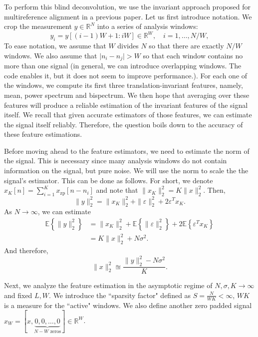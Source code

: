 \documentclass[12pt,a4paper]{article}
\theoremstyle{plain}
\theoremstyle{definition}
\theoremstyle{remark}
\theoremstyle{plain}
\theoremstyle{remark}
\theoremstyle{plain}
\theoremstyle{plain}
\newcommand{\RN}{\mathbb{R}^N}
\newcommand{\E}[1]{\mathbb{E}\left\{{#1} \right\}}
\newcommand{\xz}{x_{\textrm{zp}}}
\begin{document}
To perform this blind deconvolution, we use the invariant approach proposed for multireference alignment in a previous paper. Let us  first introduce  notation. We crop the measurement $y\in\RN$ into a series of analysis windows: 
\begin{equation}
    y_i = y[(i-1)W + 1 : iW ]\in\mathbb{R}^W, \quad i=1,\ldots,N/W, 
\end{equation}
To ease notation, we assume that  $W$ divides $N$  so that there are exactly $N/W$ windows. We also assume that $\vert n_i - n_j\vert >W$ so that each window contains no more than one signal (in general, we can introduce overlapping windows. The code enables it, but it does not seem to improve performance.).
For each one of the windows, we compute its first three translation-invariant features, namely, mean, power spectrum and bispectrum. We then hope that averaging over these features will produce a reliable estimation of the invariant features of the signal itself. 
We recall that given accurate estimators of those features, we can estimate the signal itself reliably. Therefore, the question boils down to the accuracy of these feature estimations.

Before moving ahead to the feature estimators, we need to estimate the norm of the signal. This is necessary since many analysis windows do not contain information on the signal, but pure noise. We will use the norm to scale the the signal's estimator.
This can be done as follows. For short, we denote $x_K[n]=\sum_{i=1}^K \xz[n-n_i]$ and note that $\|x_K\|_2^2 = K\|x\|_2^2$. 
Then,
\begin{equation}
\| y\|_2^2 =  \| x_K\|_2^2 + \|\varepsilon\|_2^2 + 2\varepsilon^Tx_K. 
\end{equation}  
As $N\to\infty$, we can estimate 
\begin{equation}
\begin{split}
\E{\| y\|_2^2} &=  \| x_K\|_2^2 + \E{\|\varepsilon\|_2^2} + 2\E{\varepsilon^Tx_K} \\ 
&= K\|x\|_2^2 + N\sigma^2. 
\end{split}	 
\end{equation}   
 And therefore, 
 \begin{equation}
 \|x\|_2^2 \approxeq \frac{\| y\|_2^2 - N\sigma^2}{K}. 
 \end{equation}

Next, we analyze the feature estimation in the asymptotic regime of $N,\sigma,K\to\infty$ and fixed $L,W$. We introduce the ``sparsity factor" defined as $S = \frac{N}{WK}<\infty$, $WK$ is a measure for the ``active" windows. We also define  another zero padded signal $x_W  = [x, \underbrace{0,0,\ldots,0}_{N-W \text{ zeros}}]\in\mathbb{R}^W$.
\end{document}
